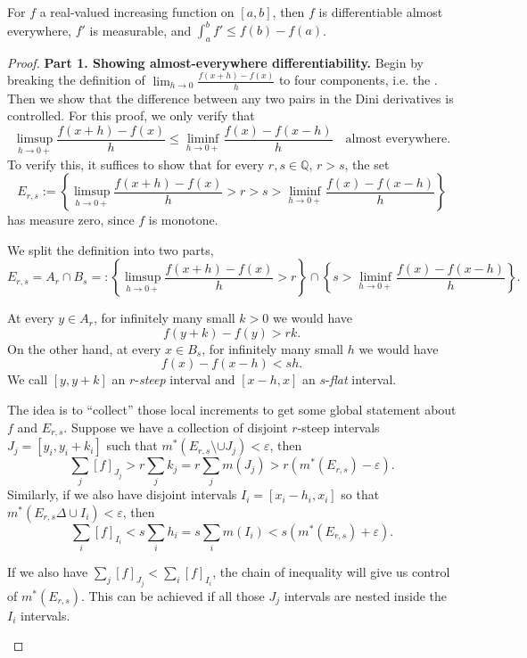 \begin{theorem}
	\label{thm:MonotoneDifferentiatithm}
	
	For $f$ a real-valued increasing function on $[a,b]$, then $f$ is differentiable almost everywhere, $f'$ is measurable, and $\int _a^b f' \le f(b) - f(a)$.
\end{theorem}
\begin{proof}
	\textbf{Part 1. Showing almost-everywhere differentiability.}
	Begin by breaking the definition of $\lim_{h \to 0} \frac{f(x + h) - f(x)}{h}$ to four components, i.e. the . Then we show that the difference between any two pairs in the Dini derivatives is controlled. 
	For this proof, we only verify that
	\[
		\limsup_{h \to 0 + } \frac{f(x + h) - f(x)}{ h} \le \liminf_{h \to 0 +}\frac{f(x) - f(x - h)}{h} \quad \text{almost everywhere}
	.\] 
	To verify this, it suffices to show that for every $r, s \in \mathbb{Q}$, $r > s$, the set
	\[
		E_{r, s} := \left\{ 
\limsup_{h \to 0 + } \frac{f(x + h) - f(x)}{ h} > r > s > \liminf_{h \to 0 +}\frac{f(x) - f(x - h)}{h}
		\right\}
	\] 
	has measure zero, since $f$ is monotone.

	We split the definition into two parts,
	\[
		E_{r, s} = A_r \cap B_s =:
		\left\{ 
		\limsup_{h \to 0 + } \frac{f(x + h) - f(x)}{ h} > r \right\} \cap  \left\{  s > \liminf_{h \to 0 +}\frac{f(x) - f(x - h)}{h}
		\right\}
	.\] 

	\begin{observation}
		At every $y \in A_r$, for infinitely many small $k>0$ we would have
		\[
			f(y + k) - f(y) > r k 
		.\] 
		On the other hand, at every $x \in B_s$, for infinitely many small $h$ we would have
		\[
			f(x) - f(x - h) < s h
		.\] 
		We call $[y, y+k]$ an $r$-\textit{steep} interval and $[x-h, x]$ an $s$-\textit{flat} interval.


		The idea is to ``collect'' those local increments to get some global statement about $f$ and $E_{r, s}$. Suppose we have a collection of disjoint $r$-steep intervals $J_j = [y_i, y_i + k_i]$ such that $m^*(E_{r, s} \setminus \cup J_j) < \varepsilon$, then
		\[
			\sum_{j} [f]_{J_j} > r \sum_j k_j = r \sum_j m(J_j) > r\left( m^*(E_{r, s}) - \varepsilon \right) 
		.\] 
		Similarly, if we also have disjoint intervals $I_i = [x_i - h_i, x_i]$ so that $m^*(E_{r, s} \Delta \cup I_i) < \varepsilon$, then
		\[
			\sum_i [f]_{I_i} < s \sum_i h_i = s \sum_i m(I_i) < s \left( m^*(E_{r, s}) + \varepsilon\right) 
		.\] 

		If we also have $\sum_{j} [f]_{J_j}  < \sum_i [f]_{I_i}$, the chain of inequality will give us control of $m^*(E_{r, s})$. This can be achieved if all those $J_j$ intervals are nested inside the $I_i$ intervals.


\end{observation}
\end{proof}
